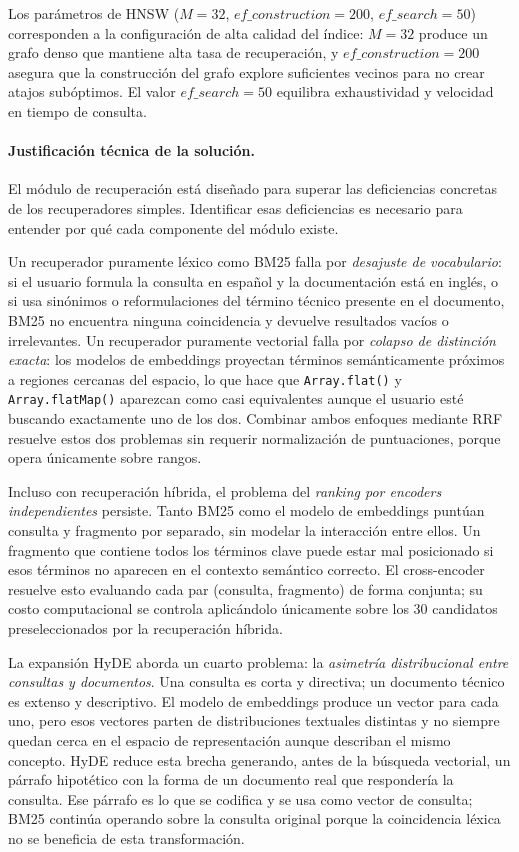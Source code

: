 \documentclass[11pt]{article}
\begin{document}
Los parámetros de HNSW ($M=32$, $\mathit{ef\_construction}=200$, $\mathit{ef\_search}=50$)
corresponden a la configuración de alta calidad del índice: $M=32$ produce un grafo denso que
mantiene alta tasa de recuperación, y $\mathit{ef\_construction}=200$ asegura que la
construcción del grafo explore suficientes vecinos para no crear atajos subóptimos. El valor
$\mathit{ef\_search}=50$ equilibra exhaustividad y velocidad en tiempo de consulta.

\paragraph{Justificación técnica de la solución.}
El módulo de recuperación está diseñado para superar las deficiencias concretas de los
recuperadores simples. Identificar esas deficiencias es necesario para entender por qué cada
componente del módulo existe.

Un recuperador puramente léxico como BM25 falla por \emph{desajuste de vocabulario}: si el
usuario formula la consulta en español y la documentación está en inglés, o si usa sinónimos o
reformulaciones del término técnico presente en el documento, BM25 no encuentra ninguna
coincidencia y devuelve resultados vacíos o irrelevantes. Un recuperador puramente vectorial
falla por \emph{colapso de distinción exacta}: los modelos de embeddings proyectan términos
semánticamente próximos a regiones cercanas del espacio, lo que hace que \texttt{Array.flat()}
y \texttt{Array.flatMap()} aparezcan como casi equivalentes aunque el usuario esté buscando
exactamente uno de los dos. Combinar ambos enfoques mediante RRF resuelve estos dos problemas
sin requerir normalización de puntuaciones, porque opera únicamente sobre rangos.

Incluso con recuperación híbrida, el problema del \emph{ranking por encoders independientes}
persiste. Tanto BM25 como el modelo de embeddings puntúan consulta y fragmento por separado, sin
modelar la interacción entre ellos. Un fragmento que contiene todos los términos clave puede
estar mal posicionado si esos términos no aparecen en el contexto semántico correcto. El
cross-encoder resuelve esto evaluando cada par (consulta, fragmento) de forma conjunta; su costo
computacional se controla aplicándolo únicamente sobre los 30 candidatos preseleccionados por la
recuperación híbrida.

La expansión HyDE aborda un cuarto problema: la \emph{asimetría distribucional entre consultas
y documentos}. Una consulta es corta y directiva; un documento técnico es extenso y descriptivo.
El modelo de embeddings produce un vector para cada uno, pero esos vectores parten de
distribuciones textuales distintas y no siempre quedan cerca en el espacio de representación
aunque describan el mismo concepto. HyDE reduce esta brecha generando, antes de la búsqueda
vectorial, un párrafo hipotético con la forma de un documento real que respondería la consulta.
Ese párrafo es lo que se codifica y se usa como vector de consulta; BM25 continúa operando
sobre la consulta original porque la coincidencia léxica no se beneficia de esta transformación.
\end{document}
